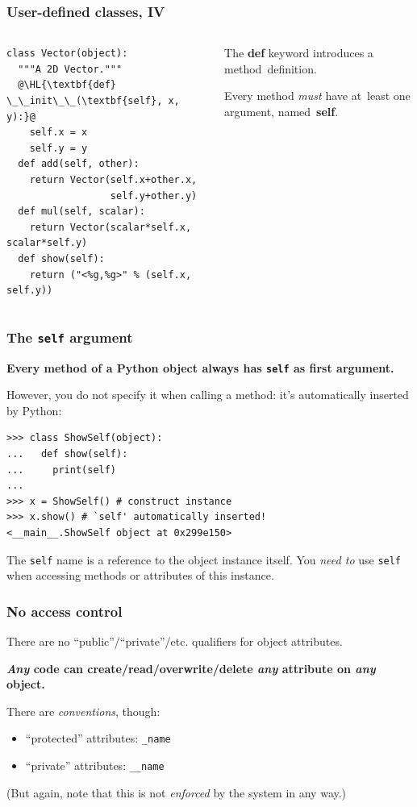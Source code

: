 \documentclass[english,serif,mathserif,xcolor=pdftex,dvipsnames,table]{beamer}
\begin{document}
\begin{frame}[fragile]
  \frametitle{User-defined classes, IV}
  \begin{columns}[t]
    \begin{column}{0.5\textwidth}
\begin{lstlisting}
class Vector(object):
  """A 2D Vector."""
  @\HL{\textbf{def} \_\_init\_\_(\textbf{self}, x, y):}@
    self.x = x
    self.y = y
  def add(self, other):
    return Vector(self.x+other.x,
                  self.y+other.y)
  def mul(self, scalar):
    return Vector(scalar*self.x, scalar*self.y)
  def show(self):
    return ("<%g,%g>" % (self.x, self.y))
\end{lstlisting}
    \end{column}
    \begin{column}{0.5\textwidth}
      \raggedleft
      The {\bf def} keyword introduces a method~definition.

      \+
      Every method \emph{must} have at~least one argument,
      named~{\bf self}.
    \end{column}
  \end{columns}
\end{frame}


\begin{frame}[fragile]
  \frametitle{The \texttt{self} argument}

  \textbf{Every method of a Python object always has \texttt{self}
    as first argument.}

  \+
  However, you do not specify it when calling a method: it's
  automatically inserted by Python:
\begin{lstlisting}
>>> class ShowSelf(object):
...   def show(self):
...     print(self)
...
>>> x = ShowSelf() # construct instance
>>> x.show() # `self' automatically inserted!
<__main__.ShowSelf object at 0x299e150>
\end{lstlisting}

  \+
  The \texttt{self} name is a reference to the object instance
  itself.  You \emph{need to} use \texttt{self} when accessing methods
  or attributes of this instance.
\end{frame}


\begin{frame}
  \frametitle{No access control}
  There are no ``public''/``private''/etc. qualifiers for object
  attributes.

  \+
  \textbf{\emph{Any} code can create/read/overwrite/delete \emph{any} attribute on
    \emph{any} object.}

  \+
  There are \emph{conventions}, though:
  \begin{itemize}
  \item ``protected'' attributes: \texttt{\_name}
  \item ``private'' attributes: \texttt{\_\_name}
  \end{itemize}
  (But again, note that this is not \emph{enforced} by the system in
  any way.)

\end{frame}
\end{document}
